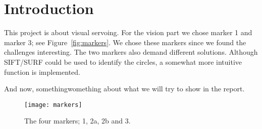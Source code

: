 \section{Introduction}
This project is about visual servoing. For the vision part we chose marker 1 and marker 3; see Figure~\vref{fig:markers}.
We chose these markers since we found the challenges interesting.
The two markers also demand different solutions.
Although SIFT/SURF could be used to identify the circles, a somewhat more intuitive function is implemented.

And now, somethingwomething about what we will try to show in the report.

\begin{figure}
\centering
\texttt{[image: markers]}
\caption{The four markers; 1, 2a, 2b and 3.}
\label{fig:markers}
\end{figure}
